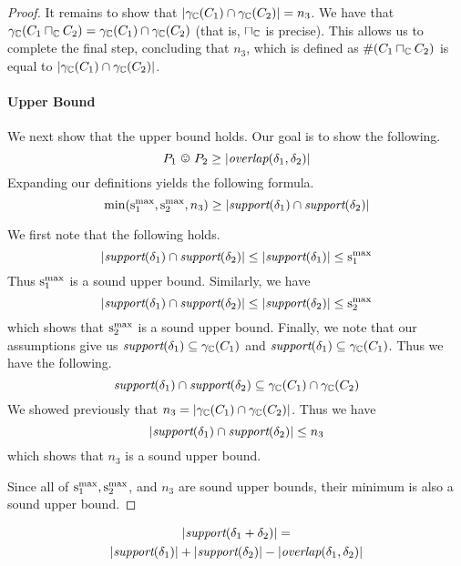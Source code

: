 \begin{proof}
It remains to show that
$\left| \gamma_{\mathbb{C}}(C_{1}) \cap \gamma_{\mathbb{C}}(C_{2}) \right| = n_3$.  We
have that $\gamma_{\mathbb{C}}(C_{1} \sqcap_{\mathbb{C}} C_{2})
= \gamma_{\mathbb{C}}(C_{1}) \cap \gamma_{\mathbb{C}}(C_{2})$ (that is, $\sqcap_{\mathbb{C}}$ is
precise).  This allows us to complete the final step, concluding that
$n_3$, which is defined as $\#(C_{1} \sqcap_{\mathbb{C}} C_{2})$ is
equal to $\left| \gamma_{\mathbb{C}}(C_{1}) \cap \gamma_{\mathbb{C}}(C_{2}) \right|$.

\paragraph{Upper Bound}

We next show that the upper bound holds.  Our goal is to show the
following.
\[ \optoverlap{\ppa}{\ppb} \geq \setsize{\overlap{\delta_1}{\delta_2}} \]
Expanding our definitions yields the following formula.
\[
\min(\mathrm{s}^\mathrm{max}_{1}, \mathrm{s}^\mathrm{max}_{2}, n_3)
{} \geq \left| \textit{support}(\delta_1) \cap \textit{support}(\delta_2) \right|
\]

We first note that the following holds.
\[\left| \textit{support}(\delta_1) \cap \textit{support}(\delta_2) \right| \leq \left| \textit{support}(\delta_1) \right| \leq \mathrm{s}^\mathrm{max}_{1}\]
Thus $\mathrm{s}^\mathrm{max}_{1}$ is a sound upper bound.  Similarly, we have
\[\left| \textit{support}(\delta_1) \cap \textit{support}(\delta_2) \right| \leq \left| \textit{support}(\delta_2) \right| \leq \mathrm{s}^\mathrm{max}_{2}\]
which shows that $\mathrm{s}^\mathrm{max}_{2}$ is a sound upper bound.  Finally, we note that our assumptions give us $\textit{support}(\delta_1) \subseteq \gamma_{\mathbb{C}}(C_{1})$ and $\textit{support}(\delta_1) \subseteq \gamma_{\mathbb{C}}(C_{1})$.  Thus we have the following.
\[\textit{support}(\delta_1) \cap \textit{support}(\delta_2) \subseteq \gamma_{\mathbb{C}}(C_{1}) \cap \gamma_{\mathbb{C}}(C_{2})\]
We showed previously that $n_3 = \left| \gamma_{\mathbb{C}}(C_{1}) \cap \gamma_{\mathbb{C}}(C_{2}) \right|$.  Thus we have
\[\left| \textit{support}(\delta_1) \cap \textit{support}(\delta_2) \right| \leq n_3\]
which shows that $n_3$ is a sound upper bound.

Since all of $\mathrm{s}^\mathrm{max}_{1}, \mathrm{s}^\mathrm{max}_{2}$, and $n_3$ are sound upper bounds, their minimum is also a sound upper bound.
\end{proof}

\begin{lemma}
\label{lem:pp:plus:setsize}
\begin{multline*}
\left| \textit{support}(\delta_1 + \delta_2) \right| =\\
 \left| \textit{support}(\delta_1) \right| + \left| \textit{support}(\delta_2) \right| - \left| \textit{overlap}(\delta_1,\delta_2) \right|
\end{multline*}
\end{lemma}

